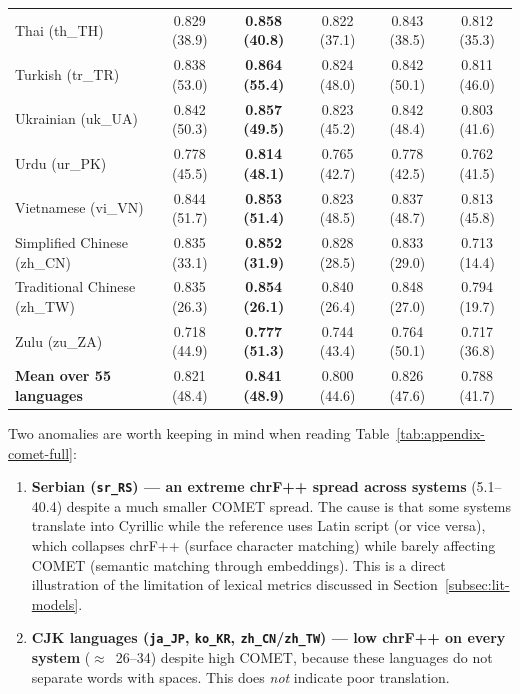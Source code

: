 \begin{longtable}{@{}lccccc@{}}
    Thai (th\_TH) & 0.829 (38.9) & \textbf{0.858 (40.8)} & 0.822 (37.1) & 0.843 (38.5) & 0.812 (35.3) \\
    Turkish (tr\_TR) & 0.838 (53.0) & \textbf{0.864 (55.4)} & 0.824 (48.0) & 0.842 (50.1) & 0.811 (46.0) \\
    Ukrainian (uk\_UA) & 0.842 (50.3) & \textbf{0.857 (49.5)} & 0.823 (45.2) & 0.842 (48.4) & 0.803 (41.6) \\
    Urdu (ur\_PK) & 0.778 (45.5) & \textbf{0.814 (48.1)} & 0.765 (42.7) & 0.778 (42.5) & 0.762 (41.5) \\
    Vietnamese (vi\_VN) & 0.844 (51.7) & \textbf{0.853 (51.4)} & 0.823 (48.5) & 0.837 (48.7) & 0.813 (45.8) \\
    Simplified Chinese (zh\_CN) & 0.835 (33.1) & \textbf{0.852 (31.9)} & 0.828 (28.5) & 0.833 (29.0) & 0.713 (14.4) \\
    Traditional Chinese (zh\_TW) & 0.835 (26.3) & \textbf{0.854 (26.1)} & 0.840 (26.4) & 0.848 (27.0) & 0.794 (19.7) \\
    Zulu (zu\_ZA) & 0.718 (44.9) & \textbf{0.777 (51.3)} & 0.744 (43.4) & 0.764 (50.1) & 0.717 (36.8) \\
    \midrule
    \textbf{Mean over 55 languages} & 0.821 (48.4) & \textbf{0.841 (48.9)} & 0.800 (44.6) & 0.826 (47.6) & 0.788 (41.7) \\
\end{longtable}
\endgroup

Two anomalies are worth keeping in mind when reading
Table~\ref{tab:appendix-comet-full}:

\begin{enumerate}
    \item \textbf{Serbian (\texttt{sr\_RS}) --- an extreme chrF++ spread across
    systems} (5.1--40.4) despite a much smaller COMET spread. The cause is that
    some systems translate into Cyrillic while the reference uses Latin script
    (or vice versa), which collapses chrF++ (surface character matching) while
    barely affecting COMET (semantic matching through embeddings). This is a
    direct illustration of the limitation of lexical metrics discussed in
    Section~\ref{subsec:lit-models}.

    \item \textbf{CJK languages (\texttt{ja\_JP}, \texttt{ko\_KR},
    \texttt{zh\_CN}/\texttt{zh\_TW}) --- low chrF++ on every system}
    ($\approx$~26--34) despite high COMET, because these languages do not
    separate words with spaces. This does \emph{not} indicate poor translation.
\end{enumerate}

